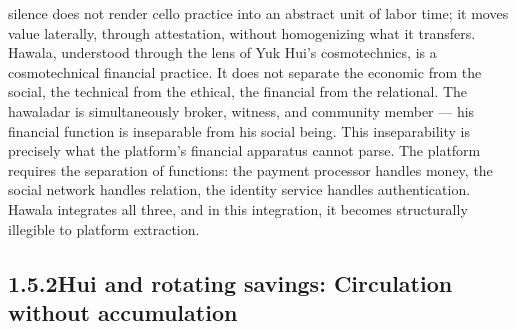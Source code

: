 silence does not render cello practice into an abstract unit of labor time; it moves value laterally, through attestation, without homogenizing what it transfers. Hawala, understood through the lens of Yuk Hui’s cosmotechnics, is a cosmotechnical financial practice. It does not separate the economic from the social, the technical from the ethical, the financial from the relational. The hawaladar is simultaneously broker, witness, and community member — his financial function is inseparable from his social being. This inseparability is precisely what the platform’s financial apparatus cannot parse. The platform requires the separation of functions: the payment processor handles money, the social network handles relation, the identity service handles authentication. Hawala integrates all three, and in this integration, it becomes structurally illegible to platform extraction.

\subsection{1.5.2\quad Hui and rotating savings: Circulation without accumulation}

